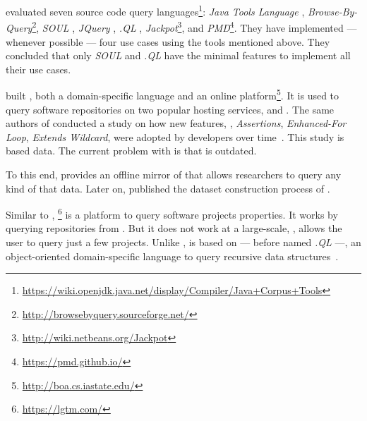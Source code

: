 \cite{urmaProgrammingLanguageEvolution2012} evaluated seven source code
query languages\footnote{\url{https://wiki.openjdk.java.net/display/Compiler/Java+Corpus+Tools}}:
\emph{Java Tools Language} \citep{cohenJTLJavaTools},
\emph{Browse-By-Query}\footnote{\url{http://browsebyquery.sourceforge.net/}},
\emph{SOUL} \citep{derooverSOULToolSuite2011},
\emph{JQuery} \citep{volderJqueryGenericCode2006},
\emph{.QL} \citep{moorKeynoteAddressQL2007},
\emph{Jackpot}\footnote{\url{http://wiki.netbeans.org/Jackpot}}, and
\emph{PMD}\footnote{\url{https://pmd.github.io/}}.
They have implemented --- whenever possible --- four use cases using the tools mentioned above.
They concluded that only \emph{SOUL} and \emph{.QL} have the minimal features to implement all their use cases.

\cite{dyerBoaLanguageInfrastructure2013,dyerDeclarativeVisitorsEase2013} built \boa{}, both a domain-specific language and an online platform\footnote{\url{http://boa.cs.iastate.edu/}}. 
It is used to query software repositories on two popular hosting services, \github{} and \sourceforge{}.
The same authors of \boa{} conducted a study on
how new \java{} features, \eg,
\emph{Assertions},
\emph{Enhanced-For Loop},
\emph{Extends Wildcard},
were adopted by developers over time~\citep{dyerMiningBillionsAST2014}.
This study is based \sourceforge{} data.
The current problem with \sourceforge{} is that is outdated.

To this end, \cite{gousiosGHTorentDatasetTool2013} provides an offline mirror of \github{} that allows researchers to query any kind of that data.
Later on, \cite{gousiosLeanGHTorrentGitHub2014} published the dataset construction process of \github{}.

Similar to \boa{}, \lgtm{}\footnote{\url{https://lgtm.com/}} is a platform to query software projects properties.
It works by querying repositories from \github{}.
But it does not work at a large-scale, \ie{}, \lgtm{} allows the user to query just a few projects.
Unlike \boa{}, \lgtm{} is based on \ql{}
--- before named \emph{.QL} ---,
an object-oriented domain-specific language to query recursive data structures~\cite{avgustinovQLObjectorientedQueries2016}.


